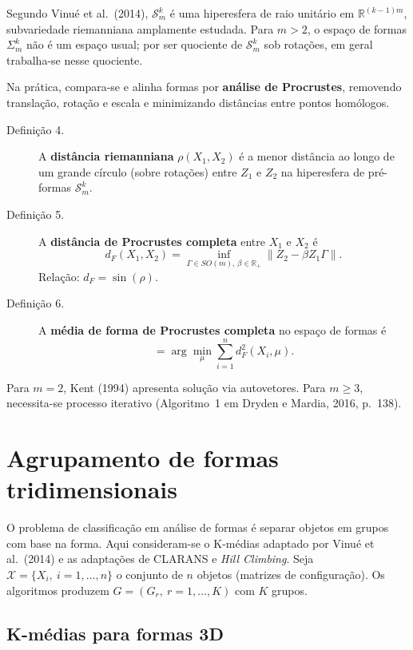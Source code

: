 \documentclass[11pt,a4paper]{article}
\begin{document}
Segundo Vinué et al.\ (2014), $\mathcal{S}_m^k$ é uma hiperesfera de raio unitário em $\mathbb{R}^{(k-1)m}$, subvariedade riemanniana amplamente estudada. Para $m>2$, o espaço de formas $\Sigma_m^k$ não é um espaço usual; por ser quociente de $\mathcal{S}_m^k$ sob rotações, em geral trabalha-se nesse quociente.

Na prática, compara-se e alinha formas por \textbf{análise de Procrustes}, removendo translação, rotação e escala e minimizando distâncias entre pontos homólogos.

\begin{description}
  \item[Definição 4.] A \textbf{distância riemanniana} $\rho(X_1,X_2)$ é a menor distância ao longo de um grande círculo (sobre rotações) entre $Z_1$ e $Z_2$ na hiperesfera de pré-formas $\mathcal{S}_m^k$.
  \item[Definição 5.] A \textbf{distância de Procrustes completa} entre $X_1$ e $X_2$ é
  \[
    d_F(X_1,X_2) = \inf_{\Gamma \in SO(m),\, \beta \in \mathbb{R}_+} \lVert Z_2 - \beta Z_1 \Gamma \rVert.
  \]
  Relação: $d_F = \sin(\rho)$.
  \item[Definição 6.] A \textbf{média de forma de Procrustes completa} no espaço de formas é
  \begin{equation}
    [\hat\mu] = \arg\min_{\mu} \sum_{i=1}^{n} d_F^2(X_i, \mu).
  \end{equation}
\end{description}

Para $m=2$, Kent (1994) apresenta solução via autovetores. Para $m \geq 3$, necessita-se processo iterativo (Algoritmo~1 em Dryden e Mardia, 2016, p.\ 138).

\section{Agrupamento de formas tridimensionais}\label{sec:algoritmos}

O problema de classificação em análise de formas é separar objetos em grupos com base na forma. Aqui consideram-se o K-médias adaptado por Vinué et al.\ (2014) e as adaptações de CLARANS e \emph{Hill Climbing}. Seja $\mathcal{X} = \{X_i,\ i=1,\ldots,n\}$ o conjunto de $n$ objetos (matrizes de configuração). Os algoritmos produzem $G = (G_r,\ r=1,\ldots,K)$ com $K$ grupos.

\subsection{K-médias para formas 3D}
\end{document}
